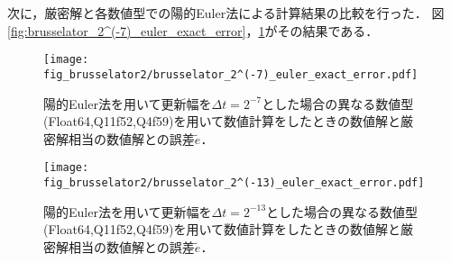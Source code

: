 次に，厳密解と各数値型での陽的Euler法による計算結果の比較を行った．
図\ref{fig:brusselator_2^(-7)_euler_exact_error}，\ref{fig:brusselator_2^(-13)_euler_exact_error}がその結果である．\\
\begin{figure}[H]
    \centering
    \begin{minipage}[b]{0.48\columnwidth}
        \centering
        \texttt{[image: fig\_brusselator2/brusselator\_2^(-7)\_euler\_exact\_error.pdf]}       \caption{陽的Euler法を用いて更新幅を$\Delta t = 2^{-7}$とした場合の異なる数値型(Float64,Q11f52,Q4f59)を用いて数値計算をしたときの数値解と厳密解相当の数値解との誤差$\tilde{e}$．}
        \label{fig:brusselator_2^(-7)_euler_exact_error}
    \end{minipage}
    \hspace{0.01\columnwidth}
    \begin{minipage}[b]{0.48\columnwidth}
        \centering
        \texttt{[image: fig\_brusselator2/brusselator\_2^(-13)\_euler\_exact\_error.pdf]}
        \caption{陽的Euler法を用いて更新幅を$\Delta t =  2^{-13}$とした場合の異なる数値型(Float64,Q11f52,Q4f59)を用いて数値計算をしたときの数値解と厳密解相当の数値解との誤差$\tilde{e}$．}
        \label{fig:brusselator_2^(-13)_euler_exact_error}
    \end{minipage}
\end{figure}



